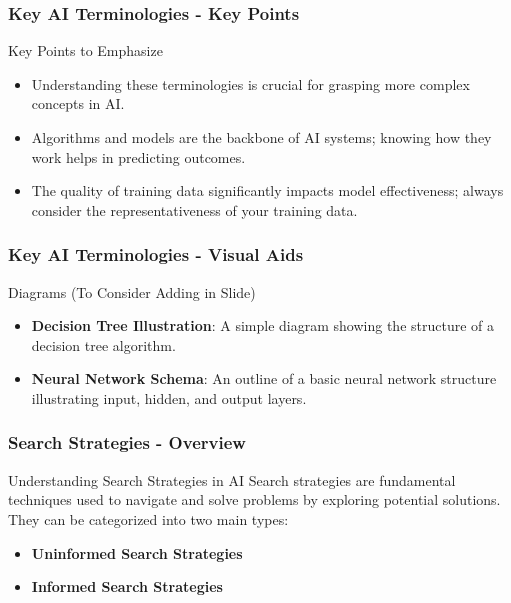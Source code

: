\documentclass[aspectratio=169]{beamer}
\begin{document}
\begin{frame}[fragile]
    \frametitle{Key AI Terminologies - Key Points}
    \begin{block}{Key Points to Emphasize}
        \begin{itemize}
            \item Understanding these terminologies is crucial for grasping more complex concepts in AI.
            \item Algorithms and models are the backbone of AI systems; knowing how they work helps in predicting outcomes.
            \item The quality of training data significantly impacts model effectiveness; always consider the representativeness of your training data.
        \end{itemize}
    \end{block}
\end{frame}

\begin{frame}[fragile]
    \frametitle{Key AI Terminologies - Visual Aids}
    \begin{block}{Diagrams (To Consider Adding in Slide)}
        \begin{itemize}
            \item \textbf{Decision Tree Illustration}: A simple diagram showing the structure of a decision tree algorithm.
            \item \textbf{Neural Network Schema}: An outline of a basic neural network structure illustrating input, hidden, and output layers.
        \end{itemize}
    \end{block}
\end{frame}

\begin{frame}[fragile]
    \frametitle{Search Strategies - Overview}
    \begin{block}{Understanding Search Strategies in AI}
        Search strategies are fundamental techniques used to navigate and solve problems by exploring potential solutions. They can be categorized into two main types:
        \begin{itemize}
            \item \textbf{Uninformed Search Strategies}
            \item \textbf{Informed Search Strategies}
        \end{itemize}
    \end{block}
\end{frame}
\end{document}
